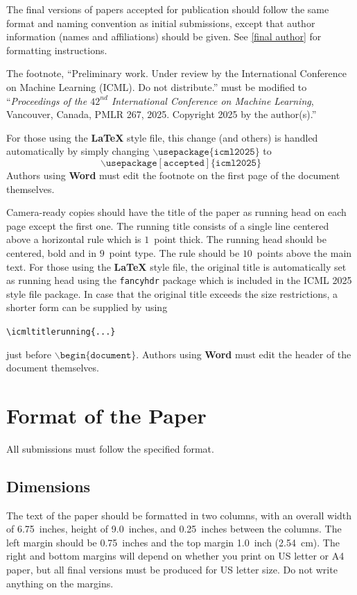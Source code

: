 \documentclass{article}
\theoremstyle{plain}
\theoremstyle{definition}
\theoremstyle{remark}
\begin{document}
The final versions of papers accepted for publication should follow the
same format and naming convention as initial submissions, except that
author information (names and affiliations) should be given. See
\cref{final author} for formatting instructions.

The footnote, ``Preliminary work. Under review by the International
Conference on Machine Learning (ICML). Do not distribute.'' must be
modified to ``\textit{Proceedings of the
$\mathit{42}^{nd}$ International Conference on Machine Learning},
Vancouver, Canada, PMLR 267, 2025.
Copyright 2025 by the author(s).''

For those using the \textbf{\LaTeX} style file, this change (and others) is
handled automatically by simply changing
$\mathtt{\backslash usepackage\{icml2025\}}$ to
$$\mathtt{\backslash usepackage[accepted]\{icml2025\}}$$
Authors using \textbf{Word} must edit the
footnote on the first page of the document themselves.

Camera-ready copies should have the title of the paper as running head
on each page except the first one. The running title consists of a
single line centered above a horizontal rule which is $1$~point thick.
The running head should be centered, bold and in $9$~point type. The
rule should be $10$~points above the main text. For those using the
\textbf{\LaTeX} style file, the original title is automatically set as running
head using the \texttt{fancyhdr} package which is included in the ICML
2025 style file package. In case that the original title exceeds the
size restrictions, a shorter form can be supplied by using

\verb|\icmltitlerunning{...}|

just before $\mathtt{\backslash begin\{document\}}$.
Authors using \textbf{Word} must edit the header of the document themselves.

\section{Format of the Paper}

All submissions must follow the specified format.

\subsection{Dimensions}




The text of the paper should be formatted in two columns, with an
overall width of 6.75~inches, height of 9.0~inches, and 0.25~inches
between the columns. The left margin should be 0.75~inches and the top
margin 1.0~inch (2.54~cm). The right and bottom margins will depend on
whether you print on US letter or A4 paper, but all final versions
must be produced for US letter size.
Do not write anything on the margins.
\end{document}
